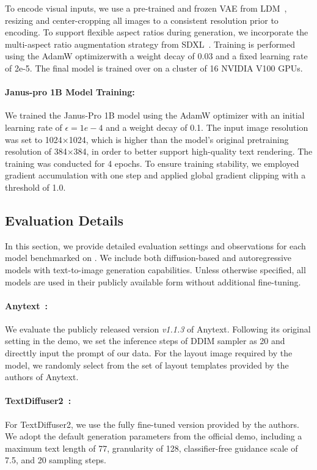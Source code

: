 To encode visual inputs, we use a pre-trained and frozen VAE from LDM~\cite{vqgan}, resizing and center-cropping all images to a consistent resolution prior to encoding. To support flexible aspect ratios during generation, we incorporate the multi-aspect ratio augmentation strategy from SDXL~\cite{sd}. Training is performed using the AdamW optimizerwith a weight decay of 0.03 and a fixed learning rate of 2e-5. 
The final model is trained over  on a cluster of 16 NVIDIA V100 GPUs.


\paragraph{Janus-pro 1B Model Training:}
We trained the Janus-Pro 1B model using the AdamW optimizer with an initial learning rate of $\epsilon=1e-4$ and a weight decay of 0.1. The input image resolution was set to 1024×1024, which is higher than the model's original pretraining resolution of 384×384, in order to better support high-quality text rendering. The training was conducted for 4 epochs. To ensure training stability, we employed gradient accumulation with one step and applied global gradient clipping with a threshold of 1.0.
\subsection{Evaluation Details}
In this section, we provide detailed evaluation settings and observations for each model benchmarked on \textit{\DatasetName}. We include both diffusion-based and autoregressive models with text-to-image generation capabilities. Unless otherwise specified, all models are used in their publicly available form without additional fine-tuning.

\paragraph{Anytext~\cite{anytext}:}
We evaluate the publicly released version \textit{v1.1.3} of Anytext. Following its original setting in the demo, we set the inference steps of DDIM sampler as 20 and directtly input the prompt of our data. For the layout image required by the model, we randomly select from the set of layout templates provided by the authors of Anytext.

\paragraph{TextDiffuser2~\cite{textdiffuser2}:}
For TextDiffuser2, we use the fully fine-tuned version provided by the authors. We adopt the default generation parameters from the official demo, including a maximum text length of 77, granularity of 128, classifier-free guidance scale of 7.5, and 20 sampling steps. 

